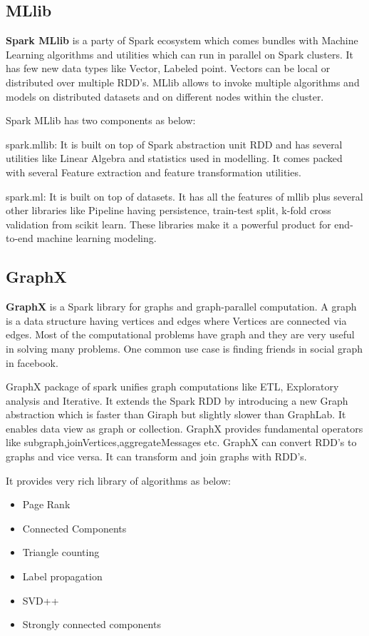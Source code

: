 \subsection{MLlib}

{\bf Spark MLlib} is a party of Spark ecosystem which comes bundles with Machine Learning algorithms
and utilities which can run in parallel on Spark clusters. It has few new data types like Vector,
Labeled point. Vectors can be local or distributed over multiple RDD's. MLlib allows to invoke
multiple algorithms and models on distributed datasets and on different nodes within the cluster.

Spark MLlib has two components as below:

spark.mllib: It is built on top of Spark abstraction unit RDD and has several utilities like
Linear Algebra and statistics used in modelling. It comes packed with several Feature extraction
and feature transformation utilities.

spark.ml: It is built on top of datasets. It has all the features of mllib plus several other
libraries like Pipeline having persistence, train-test split, k-fold cross validation from
scikit learn. These libraries make it a powerful product for end-to-end machine learning modeling.


\subsection{GraphX}

{\bf GraphX} is a Spark library for graphs and graph-parallel computation. A graph is a data
structure having vertices and edges where Vertices are connected via edges. Most of the
computational problems have graph and they are very useful in solving many problems. One common use
case is finding friends in social graph in facebook.

GraphX package of spark unifies graph computations like ETL, Exploratory analysis and Iterative.
It extends the Spark RDD by introducing a new Graph abstraction which is faster than Giraph but
slightly slower than GraphLab. It enables data view as graph or collection. GraphX provides
fundamental operators like subgraph,joinVertices,aggregateMessages etc.
GraphX can convert RDD's to graphs and vice versa. It can transform and join graphs with RDD's.

It provides very rich library of algorithms as below:

\begin{itemize}
   \item Page Rank 
   \item Connected Components
   \item Triangle counting
   \item Label propagation
   \item SVD++
   \item Strongly connected components
\end{itemize}


